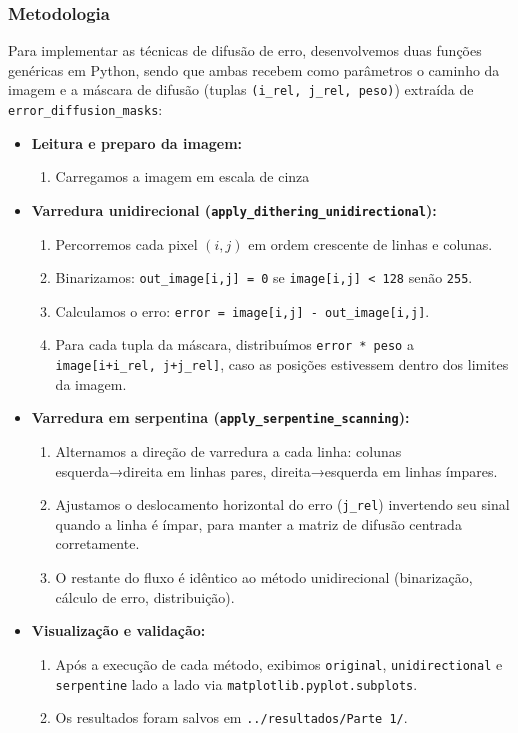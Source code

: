 \documentclass[12pt,a4paper]{article}
\begin{document}
\subsubsection*{Metodologia}
Para implementar as técnicas de difusão de erro, desenvolvemos duas funções genéricas em Python, sendo que ambas recebem como parâmetros o caminho da imagem e a máscara de difusão (tuplas \texttt{(i\_rel, j\_rel, peso)}) extraída de \texttt{error\_diffusion\_masks}:
\begin{itemize}
  \item \textbf{Leitura e preparo da imagem:}
    \begin{enumerate}
      \item Carregamos a imagem em escala de cinza 
    \end{enumerate}
  \item \textbf{Varredura unidirecional (\texttt{apply\_dithering\_unidirectional}):}
    \begin{enumerate}
      \item Percorremos cada pixel $(i,j)$ em ordem crescente de linhas e colunas.
      \item Binarizamos: \texttt{out\_image[i,j] = 0} se \texttt{image[i,j] < 128} senão \texttt{255}.
      \item Calculamos o erro: \texttt{error = image[i,j] - out\_image[i,j]}.
      \item Para cada tupla da máscara, distribuímos \texttt{error * peso} a \texttt{image[i+i\_rel, j+j\_rel]}, caso as posições estivessem dentro dos limites da imagem.
    \end{enumerate}
  \item \textbf{Varredura em serpentina (\texttt{apply\_serpentine\_scanning}):}
    \begin{enumerate}
      \item Alternamos a direção de varredura a cada linha: colunas esquerda→direita em linhas pares, direita→esquerda em linhas ímpares.
      \item Ajustamos o deslocamento horizontal do erro (\texttt{j\_rel}) invertendo seu sinal quando a linha é ímpar, para manter a matriz de difusão centrada corretamente.
      \item O restante do fluxo é idêntico ao método unidirecional (binarização, cálculo de erro, distribuição).
    \end{enumerate}
  \item \textbf{Visualização e validação:}
    \begin{enumerate}
      \item Após a execução de cada método, exibimos \texttt{original}, \texttt{unidirectional} e \texttt{serpentine} lado a lado via \texttt{matplotlib.pyplot.subplots}.
      \item Os resultados foram salvos em \texttt{../resultados/Parte\ 1/}.
    \end{enumerate}
\end{itemize}
\end{document}
